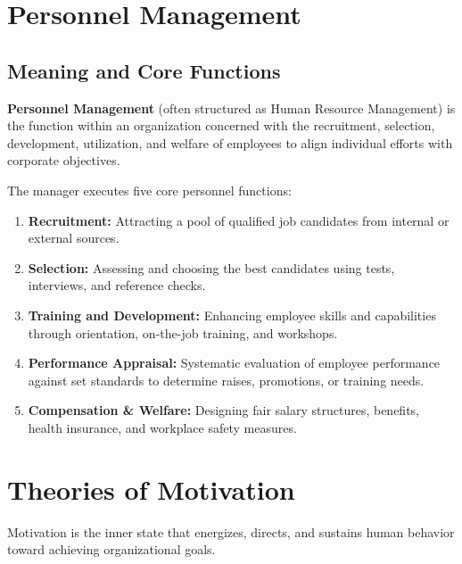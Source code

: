 \documentclass[12pt,a4paper]{article}
\begin{document}
\section{Personnel Management}

\subsection{Meaning and Core Functions}
\begin{tcolorbox}[defbox, title={Definition of Personnel Management}]
\textbf{Personnel Management} (often structured as Human Resource Management) is the function within an organization concerned with the recruitment, selection, development, utilization, and welfare of employees to align individual efforts with corporate objectives.
\end{tcolorbox}

The manager executes five core personnel functions:
\begin{enumerate}[label=\textbf{\arabic*.}, leftmargin=*, itemsep=3.5pt]
  \item \textbf{Recruitment:} Attracting a pool of qualified job candidates from internal or external sources.
  \item \textbf{Selection:} Assessing and choosing the best candidates using tests, interviews, and reference checks.
  \item \textbf{Training and Development:} Enhancing employee skills and capabilities through orientation, on-the-job training, and workshops.
  \item \textbf{Performance Appraisal:} Systematic evaluation of employee performance against set standards to determine raises, promotions, or training needs.
  \item \textbf{Compensation \& Welfare:} Designing fair salary structures, benefits, health insurance, and workplace safety measures.
\end{enumerate}

\section{Theories of Motivation}

Motivation is the inner state that energizes, directs, and sustains human behavior toward achieving organizational goals.
\end{document}
